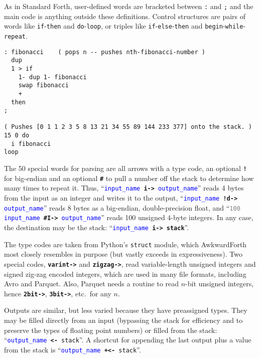 \documentclass{webofc}
\begin{document}
As in Standard Forth, user-defined words are bracketed between \texttt{:} and \texttt{;} and the main code is anything outside these definitions. Control structures are pairs of words like \texttt{if}-\texttt{then} and \texttt{do}-\texttt{loop}, or triples like \texttt{if}-\texttt{else}-\texttt{then} and \texttt{begin}-\texttt{while}-\texttt{repeat}.

\begin{verbatim}
: fibonacci    ( pops n -- pushes nth-fibonacci-number )
  dup
  1 > if
    1- dup 1- fibonacci
    swap fibonacci
    +
  then
;

( Pushes [0 1 1 2 3 5 8 13 21 34 55 89 144 233 377] onto the stack. )
15 0 do
  i fibonacci
loop
\end{verbatim}

The 50 special words for parsing are all arrows with a type code, an optional \textcolor{OliveGreen}{\tt\textbf{!}} for big-endian and an optional \textcolor{OliveGreen}{\tt\textbf{\#}} to pull a number off the stack to determine how many times to repeat it. Thus, ``{\tt \textcolor{blue}{input\_name} \textcolor{OliveGreen}{\textbf{i->}} \textcolor{blue}{output\_name}}'' reads 4 bytes from the input as an integer and writes it to the output, ``{\tt \textcolor{blue}{input\_name} \textcolor{OliveGreen}{\textbf{!d->}} \textcolor{blue}{output\_name}}'' reads 8 bytes as a big-endian, double-precision float, and ``{\tt \textcolor{gray}{100} \textcolor{blue}{input\_name} \textcolor{OliveGreen}{\textbf{\#I->}} \textcolor{blue}{output\_name}}'' reads 100 unsigned 4-byte integers. In any case, the destination may be the stack: ``{\tt \textcolor{blue}{input\_name} \textcolor{OliveGreen}{\textbf{i->}} \textcolor{OliveGreen}{\textbf{stack}}}''.

The type codes are taken from Python's \texttt{struct} module, which AwkwardForth most closely resembles in purpose (but vastly exceeds in expressiveness). Two special codes, \textcolor{OliveGreen}{\tt\textbf{varint->}} and \textcolor{OliveGreen}{\tt\textbf{zigzag->}}, read variable-length unsigned integers and signed zig-zag encoded integers, which are used in many file formats, including Avro and Parquet. Also, Parquet needs a routine to read $n$-bit unsigned integers, hence \textcolor{OliveGreen}{\tt\textbf{2bit->}}, \textcolor{OliveGreen}{\tt\textbf{3bit->}}, etc.\ for any $n$.

Outputs are similar, but less varied because they have preassigned types. They may be filled directly from an input (bypassing the stack for efficiency and to preserve the types of floating point numbers) or filled from the stack: ``{\tt \textcolor{blue}{output\_name} \textcolor{OliveGreen}{\textbf{<-}} \textcolor{OliveGreen}{stack}}''. A shortcut for appending the last output plus a value from the stack is ``{\tt \textcolor{blue}{output\_name} \textcolor{OliveGreen}{\textbf{+<-}} \textcolor{OliveGreen}{stack}}''.
\end{document}
